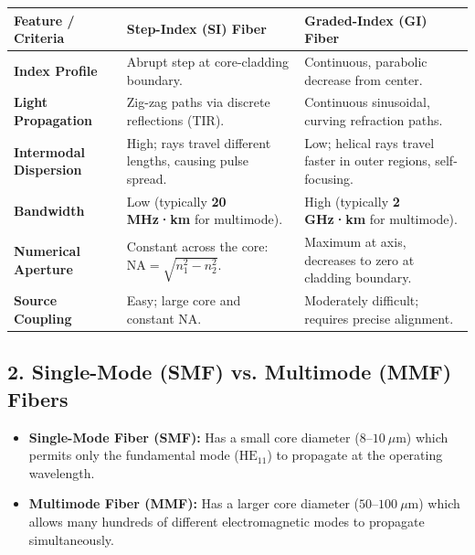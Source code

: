 \begin{table}[H]
\centering
\begin{tabular}{|p{}|p{}|p{}|}
\hline
Feature / Criteria & Step-Index (SI) Fiber & Graded-Index (GI) Fiber \\
\hline
\textbf{Index Profile} & Abrupt step at core-cladding boundary. & Continuous, parabolic decrease from center. \\
\hline
\textbf{Light Propagation} & Zig-zag paths via discrete reflections (TIR). & Continuous sinusoidal, curving refraction paths. \\
\hline
\textbf{Intermodal Dispersion} & High; rays travel different lengths, causing pulse spread. & Low; helical rays travel faster in outer regions, self-focusing. \\
\hline
\textbf{Bandwidth} & Low (typically \textbf{20 MHz·km} for multimode). & High (typically \textbf{2 GHz·km} for multimode). \\
\hline
\textbf{Numerical Aperture} & Constant across the core: $\text{NA} = \sqrt{n_1^2 - n_2^2}$. & Maximum at axis, decreases to zero at cladding boundary. \\
\hline
\textbf{Source Coupling} & Easy; large core and constant NA. & Moderately difficult; requires precise alignment. \\
\hline
\end{tabular}
\end{table}


\subsection{2. Single-Mode (SMF) vs. Multimode (MMF) Fibers}

\begin{itemize}
  \item   \textbf{Single-Mode Fiber (SMF):} Has a small core diameter ($8\text{--}10\ \mu\text{m}$) which permits only the fundamental mode ($\text{HE}_{11}$) to propagate at the operating wavelength.
  \item   \textbf{Multimode Fiber (MMF):} Has a larger core diameter ($50\text{--}100\ \mu\text{m}$) which allows many hundreds of different electromagnetic modes to propagate simultaneously.
\end{itemize}

